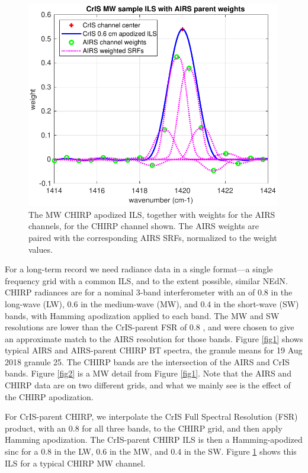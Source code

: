 \documentclass[11pt]{article}
\begin{document}
\begin{figure} %
  \centering
  \includegraphics[height=9cm]{figures/sample_CrIS_ILS_with_AIRS_parent_SRFs.pdf}
  \caption{The MW CHIRP apodized ILS, together with weights for the
    AIRS channels, for the CHIRP channel shown.  The AIRS weights
    are paired with the corresponding AIRS SRFs, normalized to the
    weight values.}
  \label{fig3}
\end{figure}

For a long-term record we need radiance data in a single format---a
single frequency grid with a common ILS, and to the extent possible,
similar NEdN.  CHIRP radiances are for a nominal 3-band
interferometer with an {\opd} of $0.8$ {\cm} in the long-wave (LW),
$0.6$ {\cm} in the medium-wave (MW), and $0.4$ {\cm} in the
short-wave (SW) bands, with Hamming apodization applied to each band.
The MW and SW resolutions are lower than the CrIS-parent FSR {\opd}
of $0.8$ {\cm}, and were chosen to give an approximate match to
the AIRS resolution for those bands.  Figure \ref{fig1} shows
typical AIRS and AIRS-parent CHIRP BT spectra, the granule means for
19 Aug 2018 granule 25.  The CHIRP bands are the intersection of the
AIRS and CrIS bands.  Figure \ref{fig2} is a MW detail from Figure
\ref{fig1}.  Note that the AIRS and CHIRP data are on two different
grids, and what we mainly see is the effect of the CHIRP
apodization.

For CrIS-parent CHIRP, we interpolate the CrIS Full Spectral
Resolution (FSR) product, with an $0.8$ {\cm} {\opd} for all three
bands, to the CHIRP grid, and then apply Hamming apodization.  The
CrIS-parent CHIRP ILS is then a Hamming-apodized sinc for a $0.8$
{\cm} {\opd} in the LW, $0.6$ {\cm} in the MW, and $0.4$ {\cm} in
the SW.  Figure \ref{fig3} shows this ILS for a typical CHIRP MW
channel.
\end{document}
